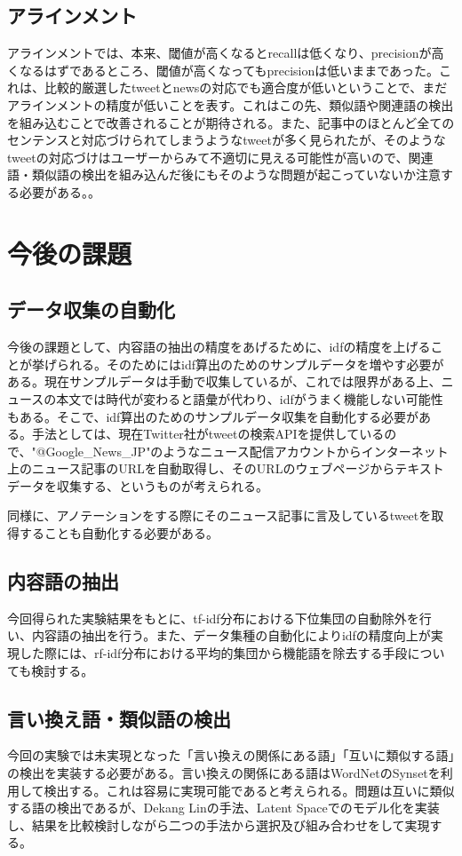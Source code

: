 \documentclass[12pt]{jarticle}
\begin{document}
\subsection{アラインメント}
アラインメントでは、本来、閾値が高くなるとrecallは低くなり、precisionが高くなるはずであるところ、閾値が高くなってもprecisionは低いままであった。これは、比較的厳選したtweetとnewsの対応でも適合度が低いということで、まだアラインメントの精度が低いことを表す。これはこの先、類似語や関連語の検出を組み込むことで改善されることが期待される。また、記事中のほとんど全てのセンテンスと対応づけられてしまうようなtweetが多く見られたが、そのようなtweetの対応づけはユーザーからみて不適切に見える可能性が高いので、関連語・類似語の検出を組み込んだ後にもそのような問題が起こっていないか注意する必要がある。。

\section{今後の課題}
\subsection{データ収集の自動化}
今後の課題として、内容語の抽出の精度をあげるために、idfの精度を上げることが挙げられる。そのためにはidf算出のためのサンプルデータを増やす必要がある。現在サンプルデータは手動で収集しているが、これでは限界がある上、ニュースの本文では時代が変わると語彙が代わり、idfがうまく機能しない可能性もある。そこで、idf算出のためのサンプルデータ収集を自動化する必要がある。手法としては、現在Twitter社がtweetの検索APIを提供しているので、"@Google\_News\_JP"のようなニュース配信アカウントからインターネット上のニュース記事のURLを自動取得し、そのURLのウェブページからテキストデータを収集する、というものが考えられる。

同様に、アノテーションをする際にそのニュース記事に言及しているtweetを取得することも自動化する必要がある。

\subsection{内容語の抽出}
今回得られた実験結果をもとに、tf-idf分布における下位集団の自動除外を行い、内容語の抽出を行う。また、データ集種の自動化によりidfの精度向上が実現した際には、rf-idf分布における平均的集団から機能語を除去する手段についても検討する。

\subsection{言い換え語・類似語の検出}
今回の実験では未実現となった「言い換えの関係にある語」「互いに類似する語」の検出を実装する必要がある。言い換えの関係にある語はWordNetのSynsetを利用して検出する。これは容易に実現可能であると考えられる。問題は互いに類似する語の検出であるが、Dekang Linの手法\cite{DekangLin}、Latent Spaceでのモデル化\cite{LatentSpace}を実装し、結果を比較検討しながら二つの手法から選択及び組み合わせをして実現する。
\end{document}

